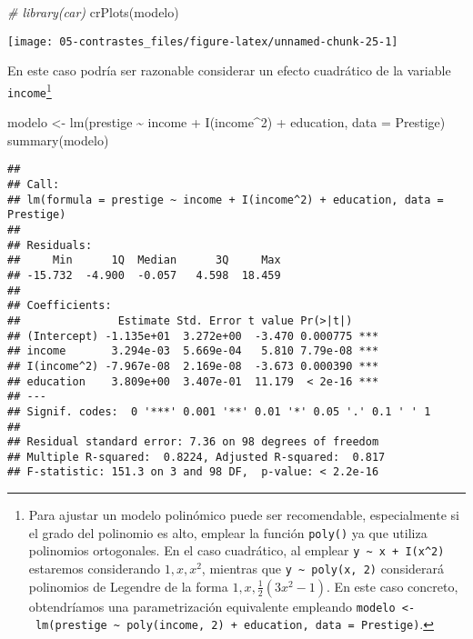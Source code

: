 \documentclass[
]{book}
\newenvironment{Shaded}{\begin{snugshade}}{\end{snugshade}}
\newcommand{\AttributeTok}[1]{\textcolor[rgb]{0.77,0.63,0.00}{#1}}
\newcommand{\CommentTok}[1]{\textcolor[rgb]{0.56,0.35,0.01}{\textit{#1}}}
\newcommand{\DecValTok}[1]{\textcolor[rgb]{0.00,0.00,0.81}{#1}}
\newcommand{\FunctionTok}[1]{\textcolor[rgb]{0.00,0.00,0.00}{#1}}
\newcommand{\NormalTok}[1]{#1}
\newcommand{\OtherTok}[1]{\textcolor[rgb]{0.56,0.35,0.01}{#1}}
\newcommand{\SpecialCharTok}[1]{\textcolor[rgb]{0.00,0.00,0.00}{#1}}
\theoremstyle{break}
\theoremstyle{definition}
\theoremstyle{definition}
\theoremstyle{definition}
\theoremstyle{definition}
\theoremstyle{remark}
\begin{document}
\begin{Shaded}
\begin{Highlighting}[]
\CommentTok{\# library(car)}
\FunctionTok{crPlots}\NormalTok{(modelo)}
\end{Highlighting}
\end{Shaded}

\begin{center}\texttt{[image: 05-contrastes\_files/figure-latex/unnamed-chunk-25-1]} \end{center}

En este caso podría ser razonable considerar un efecto cuadrático
de la variable \texttt{income}\footnote{Para ajustar un modelo polinómico
  puede ser recomendable, especialmente si el grado del polinomio es alto,
  emplear la función \texttt{poly()} ya que utiliza polinomios ortogonales.
  En el caso cuadrático, al emplear \texttt{y\ \textasciitilde{}\ x\ +\ I(x\^{}2)}
  estaremos considerando \(1, x, x^2\), mientras que \texttt{y\ \textasciitilde{}\ poly(x,\ 2)} considerará
  polinomios de Legendre de la forma \(1, x, \frac{1}{2}(3x^2-1)\).
  En este caso concreto, obtendríamos una parametrización equivalente
  empleando \texttt{modelo\ \textless{}-\ lm(prestige\ \textasciitilde{}\ poly(income,\ 2)\ +\ education,\ data\ =\ Prestige)}.}

\begin{Shaded}
\begin{Highlighting}[]
\NormalTok{modelo }\OtherTok{\textless{}{-}} \FunctionTok{lm}\NormalTok{(prestige }\SpecialCharTok{\textasciitilde{}}\NormalTok{ income }\SpecialCharTok{+} \FunctionTok{I}\NormalTok{(income}\SpecialCharTok{\^{}}\DecValTok{2}\NormalTok{) }\SpecialCharTok{+}\NormalTok{ education, }\AttributeTok{data =}\NormalTok{ Prestige)}
\FunctionTok{summary}\NormalTok{(modelo)}
\end{Highlighting}
\end{Shaded}

\begin{verbatim}
## 
## Call:
## lm(formula = prestige ~ income + I(income^2) + education, data = Prestige)
## 
## Residuals:
##     Min      1Q  Median      3Q     Max 
## -15.732  -4.900  -0.057   4.598  18.459 
## 
## Coefficients:
##               Estimate Std. Error t value Pr(>|t|)    
## (Intercept) -1.135e+01  3.272e+00  -3.470 0.000775 ***
## income       3.294e-03  5.669e-04   5.810 7.79e-08 ***
## I(income^2) -7.967e-08  2.169e-08  -3.673 0.000390 ***
## education    3.809e+00  3.407e-01  11.179  < 2e-16 ***
## ---
## Signif. codes:  0 '***' 0.001 '**' 0.01 '*' 0.05 '.' 0.1 ' ' 1
## 
## Residual standard error: 7.36 on 98 degrees of freedom
## Multiple R-squared:  0.8224, Adjusted R-squared:  0.817 
## F-statistic: 151.3 on 3 and 98 DF,  p-value: < 2.2e-16
\end{verbatim}
\end{document}

